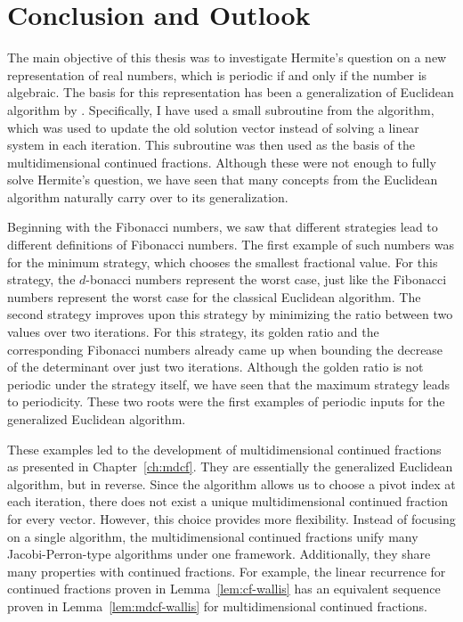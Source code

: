 \chapter{Conclusion and Outlook}
\label{ch:conclusion}

The main objective of this thesis
was to investigate Hermite's question
on a new representation of real numbers,
which is periodic if and only if the number is algebraic.
The basis for this representation has been a generalization of Euclidean
algorithm by \citeauthor{Klein24}.
Specifically, I have used a small subroutine from the algorithm,
which was used to update the old solution vector instead of solving a linear
system in each iteration.
This subroutine was then used as the basis of the multidimensional continued fractions.
Although these were not enough to fully solve Hermite's question,
we have seen that many concepts from the Euclidean algorithm naturally carry
over to its generalization.

Beginning with the Fibonacci numbers,
we saw that different strategies lead to different definitions of Fibonacci numbers.
The first example of such numbers was for the minimum strategy,
which chooses the smallest fractional value.
For this strategy, the $d$-bonacci numbers represent the worst case,
just like the Fibonacci numbers represent the worst case for the classical
Euclidean algorithm.
The second strategy improves upon this strategy by minimizing the ratio between two values over two iterations.
For this strategy, its golden ratio and the corresponding Fibonacci numbers
already came up when bounding the decrease of the determinant over just two iterations.
Although the golden ratio is not periodic under the strategy itself,
we have seen that the maximum strategy leads to periodicity.
These two roots were the first examples of periodic inputs for the generalized Euclidean algorithm.

These examples led to the development of multidimensional continued fractions
as presented in Chapter~\ref{ch:mdcf}.
They are essentially the generalized Euclidean algorithm, but in reverse.
Since the algorithm allows us to choose a pivot index at each iteration,
there does not exist a unique multidimensional continued fraction for every vector.
However, this choice provides more flexibility.
Instead of focusing on a single algorithm, the multidimensional continued
fractions unify many Jacobi-Perron-type algorithms under one framework.
Additionally, they share many properties with continued fractions.
For example, the linear recurrence for continued fractions proven in Lemma~\ref{lem:cf-wallis}
has an equivalent sequence proven in Lemma~\ref{lem:mdcf-wallis} for
multidimensional continued fractions.


